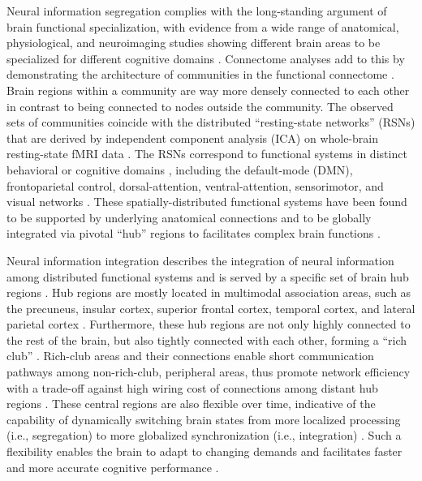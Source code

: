 \begin{refsection}
Neural information segregation complies with the long-standing argument of brain functional specialization, with evidence from a wide range of anatomical, physiological, and neuroimaging studies showing different brain areas to be specialized for different cognitive domains \citep{Finger1994OriginsON}. Connectome analyses add to this by demonstrating the architecture of communities in the functional connectome \citep{Sporns2016ModularBN}. Brain regions within a community are way more densely connected to each other in contrast to being connected to nodes outside the community. The observed sets of communities coincide with the distributed “resting-state networks” (RSNs) that are derived by independent component analysis (ICA) on whole-brain resting-state fMRI data \citep{Beckmann2005InvestigationsIR}. The RSNs correspond to functional systems in distinct behavioral or cognitive domains \citep{smith2009correspondence,Laird2011BehavioralIO}, including the default-mode (DMN), frontoparietal control, dorsal-attention, ventral-attention, sensorimotor, and visual networks \citep{Power2011FunctionalNO,thomas2011organization}. These spatially-distributed functional systems have been found to be supported by underlying anatomical connections \citep{Heuvel2009FunctionallyLR} and to be globally integrated via pivotal “hub” regions to facilitates complex brain functions \citep{van_den_heuvel_network_2013}.

Neural information integration describes the integration of neural information among distributed functional systems and is served by a specific set of brain hub regions \citep{Heuvel2013AnAS}. Hub regions are mostly located in multimodal association areas, such as the precuneus, insular cortex, superior frontal cortex, temporal cortex, and lateral parietal cortex \citep{van_den_heuvel_network_2013}. Furthermore, these hub regions are not only highly connected to the rest of the brain, but also tightly connected with each other, forming a “rich club”  \citep{vanDenHeuvel2011RichclubOO,Griffa2018RichclubNF}. Rich-club areas and their connections enable short communication pathways among non-rich-club, peripheral areas, thus promote network efficiency with a trade-off against high wiring cost of connections among distant hub regions \citep{vanDenHeuvel2012HighcostHB}. These central regions are also flexible over time, indicative of the capability of dynamically switching brain states from more localized processing (i.e., segregation) to more globalized synchronization (i.e., integration) \citep{Zalesky2014TimeresolvedRB,Shine2015TheDO}. Such a flexibility enables the brain to adapt to changing demands \citep{Cole2013MultitaskCR} and facilitates faster and more accurate cognitive performance \citep{Shine2015TheDO}. 


\end{refsection}

